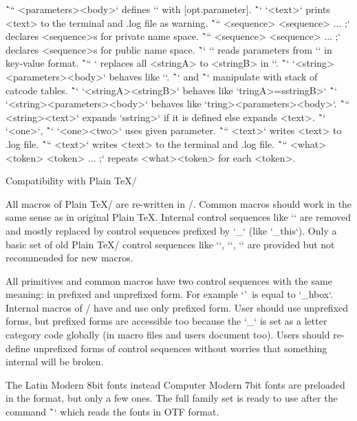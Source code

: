 {\^`\optdef``  <parameters>{<body>}` defines `\macro` with [opt.parameter].\nl
\^`\opwarning` `{<text>}` prints <text> to the terminal and .log file as warning.\nl
\~`\private`` <sequence> <sequence> ... ;` declares <sequence>s for private name space.\nl
\~`\public`` <sequence> <sequence> ... ;` declares <sequence>s for public name space.\nl
\~`\readkv` `\macro` reads parameters from `\macro` in key-value format.\nl
\^`\replstring`` ` replaces all <stringA> to <stringB> in `\macro`.\nl
\^`\sdef` `{<string>}<parameters>{<body>}` behaves like `\def\<string><parameters>{<body>}`.\nl
\^`\setctable` and \^`\restorectable` manipulate with stack of catcode tables.\nl
\^`\slet` `{<stringA>}{<stringB>}` behaves like `\let\<stringA>=\<stringB>`\nl
\^`\sxdef` `{<string>}<parameters>{<body>}` behaves like `\xdef\<string><parameters>{<body>}`.\nl
\^`\trycs`` {<string>}{<text>}` expands `\<string>` if it is defined else expands <text>.\nl
\^`\useit` `<one>`, \^`\usesecond` `<one><two>` uses given parameter.\nl
\^`\wlog`` {<text>}` writes <text> to .log file.\nl
\^`\wterm`` {<text>}` writes <text> to the terminal and .log file.\nl
\^`\xargs`` <what> <token> <token> ... ;` repeats <what><token> for each <token>.\nl
\unpenalty\unskip

\sec Compatibility with Plain \TeX/

All macros of Plain \TeX/ are re-written in \OpTeX/. Common macros should
work in the same sense as in original Plain \TeX. Internal control sequences
like `\f@@t` are removed and mostly replaced by control sequences
prefixed by `_` (like `\_this`). Only a basic set of old Plain
\TeX/ control sequences like `\p@`, `\z@`, `\dimen@` are provided
but not recommended for new macros.

All primitives and common macros have two
control sequences with the same meaning: in prefixed and unprefixed form.
For example `\hbox` is equal to `\_hbox`.
Internal macros of \OpTeX/ have and use only prefixed form. User should use
unprefixed forms, but prefixed forms are accessible too because the `_` is
set as a letter category code globally (in macro files and users document too). Users
should re-define unprefixed forms of control sequences without worries that
something internal will be broken.

\new
The Latin Modern 8bit fonts instead Computer Modern 7bit fonts are
preloaded in the format, but only a few ones. The full family set is ready to
use after the command \~`\fontfam[LMfonts]` which reads the fonts in OTF
format.

}
